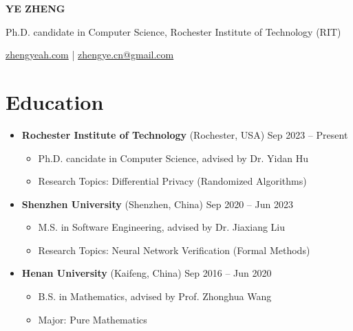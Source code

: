 \documentclass[a4paper,11pt]{article}
\newcommand{\topicon}[1]{\raisebox{0.01em}{\resizebox{!}{0.7em}{#1}}}
\newcommand{\headerfontiii}{\fontfamily{ppl}\selectfont} %
\begin{document}
\headerfontiii

\begin{center}
    {\Huge\textbf{YE ZHENG}}
\end{center}
\vspace{-3mm}

\begin{center}
  \small{Ph.D. candidate in Computer Science, Rochester Institute of Technology (RIT)}
\end{center}
\vspace{-6mm}
\begin{center}
    \small{\topicon{\faGlobe} \href{https://zhengyeah.com}{zhengyeah.com} | 
    \topicon{\faMailBulk} \href{mailto:zhengye.cn@gmail.com}{zhengye.cn@gmail.com}}
\end{center}

\section{\textbf{Education}}

\begin{itemize}[leftmargin=0pt,label={}]
    \item \textbf{Rochester Institute of Technology}{ \scriptsize (Rochester, USA)} \hfill Sep 2023 -- Present\vspace{-0.5em}    
    \begin{itemize}
      \item Ph.D. cancidate in Computer Science, advised by Dr. Yidan Hu
      \item Research Topics: Differential Privacy (Randomized Algorithms)
    \end{itemize}
    \item \textbf{Shenzhen University}{ \scriptsize (Shenzhen, China)} \hfill Sep 2020 -- Jun 2023\vspace{-0.5em}
    \begin{itemize}
      \item M.S. in Software Engineering, advised by Dr. Jiaxiang Liu
      \item Research Topics: Neural Network Verification (Formal Methods)
    \end{itemize}
    \item \textbf{Henan University}{ \scriptsize (Kaifeng, China)} \hfill Sep 2016 -- Jun 2020\vspace{-0.5em}
    \begin{itemize}
      \item B.S. in Mathematics, advised by Prof. Zhonghua Wang
      \item Major: Pure Mathematics
    \end{itemize}
\end{itemize}
\end{document}

